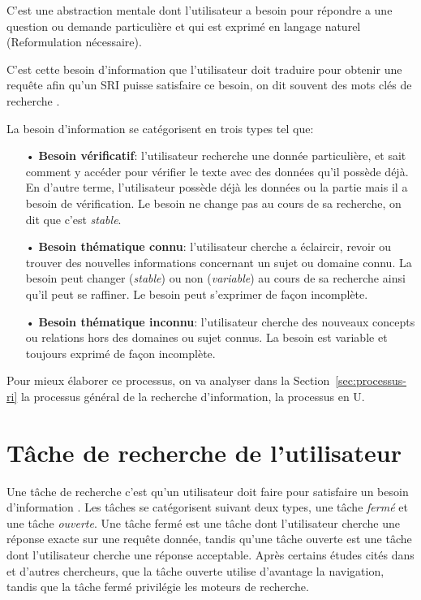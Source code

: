 \begin{definition}
    C'est une abstraction mentale dont l'utilisateur a besoin pour répondre a une question ou demande particulière et qui est exprimé en langage naturel \citep{amelioration-ri-approche-semantique} (Reformulation nécessaire).
\end{definition}

C'est cette besoin d'information que l'utilisateur doit traduire pour obtenir une requête afin qu'un SRI puisse satisfaire ce besoin, on dit souvent des mots clés de recherche \citep{modern-ir}.

La besoin d'information se catégorisent en trois types \citep{paradis:tel-00005009} tel que:
\begin{itemize}
    \item[•] \textbf{Besoin vérificatif}: l'utilisateur recherche une donnée particulière, et sait comment y accéder pour vérifier le texte avec des données qu'il possède déjà. En d'autre terme, l'utilisateur possède déjà les données ou la partie mais il a besoin de vérification. Le besoin ne change pas au cours de sa recherche, on dit que c'est \textit{stable}.
    \item[•] \textbf{Besoin thématique connu}: l'utilisateur cherche a éclaircir, revoir ou trouver des nouvelles informations concernant un sujet ou domaine connu. La besoin peut changer (\textit{stable}) ou non (\textit{variable}) au cours de sa recherche ainsi qu'il peut se raffiner. Le besoin peut s'exprimer de façon incomplète.
    \item[•] \textbf{Besoin thématique inconnu}: l'utilisateur cherche des nouveaux concepts ou relations hors des domaines ou sujet connus. La besoin est variable et toujours exprimé de façon incomplète.
\end{itemize}

Pour mieux élaborer ce processus, on va analyser dans la Section~\ref{sec:processus-ri} la processus général de la recherche d'information, la processus en U.

\section{Tâche de recherche de l'utilisateur}
Une tâche de recherche c'est qu'un utilisateur doit faire pour satisfaire un besoin d'information \citep*{boubee-tricot-2010,ri-sur-le-web}.
Les tâches se catégorisent suivant deux types, une tâche \emph{fermé} et une tâche \emph{ouverte}. Une tâche fermé est une tâche dont l'utilisateur cherche une réponse exacte sur une requête donnée, tandis qu'une tâche ouverte est une tâche dont l'utilisateur cherche une réponse acceptable. Après certains études cités dans \citep{ri-sur-le-web} et d'autres chercheurs, que la tâche ouverte utilise d'avantage la navigation, tandis que la tâche fermé privilégie les moteurs de recherche.

